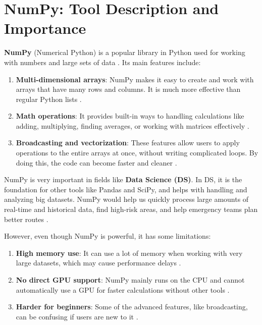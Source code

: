 \documentclass[a4paper, 11pt]{report}
\begin{document}
\section*{NumPy: Tool Description and Importance}

\textbf{NumPy} (Numerical Python) is a popular library in Python used for working with numbers and large sets of data \cite{harris2020}. Its main features include:

\begin{enumerate}
    \item \textbf{Multi-dimensional arrays}: NumPy makes it easy to create and work with arrays that have many rows and columns. It is much more effective than regular Python lists \cite{harris2020}.
    \item \textbf{Math operations}: It provides built-in ways to handling calculations like adding, multiplying, finding averages, or working with matrices effectively \cite{harris2020}.
    \item \textbf{Broadcasting and vectorization}: These features allow users to apply operations to the entire arrays at once, without writing complicated loops. By doing this, the code can become faster and cleaner \cite{harris2020}.
\end{enumerate}

NumPy is very important in fields like \textbf{Data Science (DS)}. In DS, it is the foundation for other tools like Pandas and SciPy, and helps with handling and analyzing big datasets. NumPy would help us quickly process large amounts of real-time and historical data, find high-risk areas, and help emergency teams plan better routes \cite{idris2013}.

However, even though NumPy is powerful, it has some limitations:

\begin{enumerate}
    \item \textbf{High memory use}: It can use a lot of memory when working with very large datasets, which may cause performance delays \cite{idris2015}.
    \item \textbf{No direct GPU support}: NumPy mainly runs on the CPU and cannot automatically use a GPU for faster calculations without other tools \cite{idris2015}.
    \item \textbf{Harder for beginners}: Some of the advanced features, like broadcasting, can be confusing if users are new to it \cite{idris2015}.
\end{enumerate}
\end{document}
